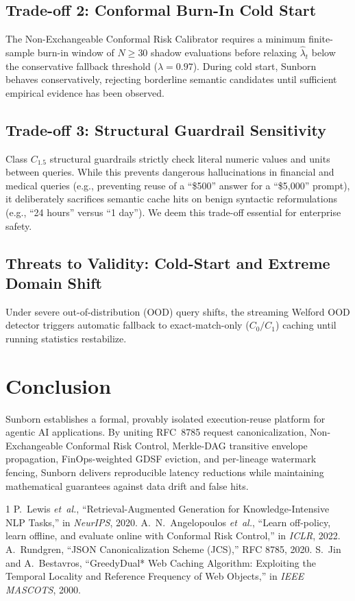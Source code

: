 \documentclass[conference]{IEEEtran}
\begin{document}
\subsection{Trade-off 2: Conformal Burn-In Cold Start}
The Non-Exchangeable Conformal Risk Calibrator requires a minimum finite-sample burn-in window of $N \ge 30$ shadow evaluations before relaxing $\hat{\lambda}_t$ below the conservative fallback threshold ($\lambda = 0.97$). During cold start, Sunborn behaves conservatively, rejecting borderline semantic candidates until sufficient empirical evidence has been observed.

\subsection{Trade-off 3: Structural Guardrail Sensitivity}
Class $C_{1.5}$ structural guardrails strictly check literal numeric values and units between queries. While this prevents dangerous hallucinations in financial and medical queries (e.g., preventing reuse of a ``\$500'' answer for a ``\$5,000'' prompt), it deliberately sacrifices semantic cache hits on benign syntactic reformulations (e.g., ``24 hours'' versus ``1 day''). We deem this trade-off essential for enterprise safety.

\subsection{Threats to Validity: Cold-Start and Extreme Domain Shift}
Under severe out-of-distribution (OOD) query shifts, the streaming Welford OOD detector triggers automatic fallback to exact-match-only ($C_0/C_1$) caching until running statistics restabilize.

\section{Conclusion}
Sunborn establishes a formal, provably isolated execution-reuse platform for agentic AI applications. By uniting RFC~8785 request canonicalization, Non-Exchangeable Conformal Risk Control, Merkle-DAG transitive envelope propagation, FinOps-weighted GDSF eviction, and per-lineage watermark fencing, Sunborn delivers reproducible latency reductions while maintaining mathematical guarantees against data drift and false hits.


\begin{thebibliography}{1}
P.~Lewis \emph{et~al.}, ``Retrieval-Augmented Generation for Knowledge-Intensive NLP Tasks,'' in \emph{NeurIPS}, 2020.
A.~N.~Angelopoulos \emph{et~al.}, ``Learn off-policy, learn offline, and evaluate online with Conformal Risk Control,'' in \emph{ICLR}, 2022.
A.~Rundgren, ``JSON Canonicalization Scheme (JCS),'' RFC 8785, 2020.
S.~Jin and A.~Bestavros, ``GreedyDual* Web Caching Algorithm: Exploiting the Temporal Locality and Reference Frequency of Web Objects,'' in \emph{IEEE MASCOTS}, 2000.
\end{thebibliography}
\end{document}
